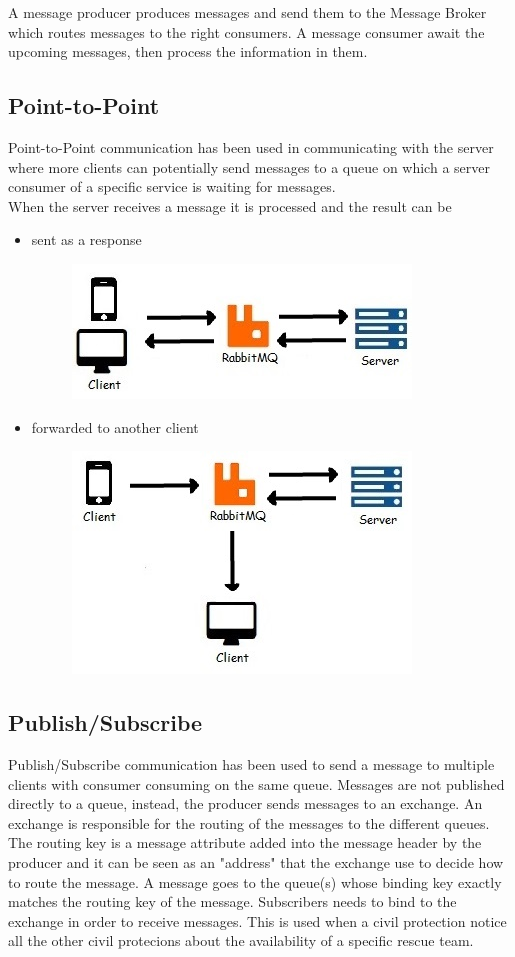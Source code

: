\documentclass[a4paper,12pt]{report}
\begin{document}
A message producer produces messages and send them to the Message Broker which
routes messages to the right consumers. A message consumer await the upcoming messages, then process the information in them.

\subsection{Point-to-Point}
Point-to-Point communication has been used in communicating with the server where more clients can potentially send messages to a queue on which a server consumer of a specific service is waiting for messages.
\\When the server receives a message it is processed and the result can be 
\begin{itemize}
\item sent as a response 
\begin{figure}[ht]
\centering
\includegraphics{figures/RPC.jpg}
\end{figure}
\item forwarded to another client
\begin{figure}[ht]
\centering
\includegraphics{figures/forward.jpg}
\end{figure}
\end{itemize}

\subsection{Publish/Subscribe}
Publish/Subscribe communication has been used to send a message to multiple clients with consumer consuming on the same queue. 
Messages are not published directly to a queue, instead, the producer sends messages to an exchange.
An exchange is responsible for the routing of the messages to the different queues. 
The routing key is a message attribute added into the message header by the producer and it can be seen as an "address" that the exchange use to decide how to route the message. 
A message goes to the queue(s) whose binding key exactly matches the routing key of the message.
Subscribers needs to bind to the exchange in order to receive messages.
This is used when a civil protection notice all the other civil protecions about the availability of a specific rescue team.
\end{document}
